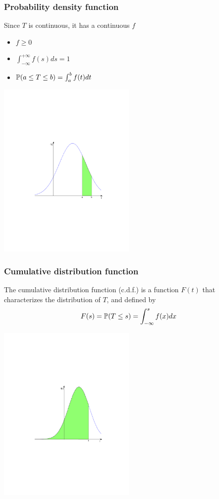 \documentclass[aspectratio=169]{beamer}\usepackage[]{graphicx}\usepackage[]{xcolor}
\begin{document}
\begin{frame}\frametitle{Probability density function}
Since $T$ is continuous, it has a continuous  $f$
\begin{itemize}
\item $f\geq 0$
\item $\int_{-\infty}^{+\infty}f(s)ds=1$
\item $\mathbb{P}(a\leq T\leq b)=\int_a^bf(t)dt$
\end{itemize}
\begin{center}
\includegraphics[width=0.5\textwidth]{FIGS/distrib_a_b}
\end{center}
\end{frame}

\begin{frame}\frametitle{Cumulative distribution function}
The cumulative distribution function (c.d.f.) is a function $F(t)$ that characterizes the distribution of $T$, and defined by
\[
F(s)=\mathbb{P}(T\leq s)=\int_{-\infty}^sf(x)dx
\]
\begin{center}
\includegraphics[width=0.5\textwidth]{FIGS/cdf_auc}
\end{center}
\end{frame}
\end{document}
